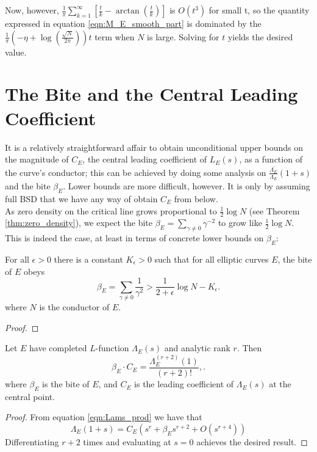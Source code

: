 \documentclass[10pt]{article}
\newcommand{\pr}{^{\prime}}
\newcommand{\Les}{L_E(s)}
\newcommand{\Lams}{\Lambda_E(s)}
\newcommand{\ldLam}[1]{\frac{\Lambda_E\pr}{\Lambda_E}\left(#1\right)}
\begin{document}
Now, however, $\frac{1}{\pi}\sum_{k=1}^{\infty} \left[\frac{t}{k} - \arctan\left(\frac{t}{k}\right)\right]$ is $O(t^3)$ for small t, so the quantity expressed in equation \ref{eqn:M_E_smooth_part} is dominated by the $\frac{1}{\pi}\left(-\eta+\log\left(\frac{\sqrt{N}}{2\pi}\right)\right) t$ term when $N$ is large. Solving for $t$ yields the desired value.

\newpage
\section{The Bite and the Central Leading Coefficient}

It is a relatively straightforward affair to obtain unconditional upper bounds on the magnitude of $C_E$, the central leading coefficient of $\Les$, as a function of the curve's conductor; this can be achieved by doing some analysis on $\ldLam{1+s}$ and the bite $\beta_E$. Lower bounds are more difficult, however. It is only by assuming full BSD that we have any way of obtain $C_E$ from below. \\

As zero density on the critical line grows proportional to $\frac{1}{2}\log N$ (see Theorem \ref{thm:zero_density}), we expect the bite $\beta_E = \sum_{\gamma\ne 0} \gamma^{-2}$ to grow like $\frac{1}{2}\log N$. This is indeed the case, at least in terms of concrete lower bounds on $\beta_E$:
\begin{lemma}[S.]
For all $\epsilon>0$ there is a constant $K_{\epsilon}>0$ such that for all elliptic curves $E$, the bite of $E$ obeys
\begin{equation}
\beta_E = \sum_{\gamma\ne 0} \frac{1}{\gamma^2} > \frac{1}{2+\epsilon} \log N - K_{\epsilon}.
\end{equation}
where $N$ is the conductor of $E$.
\end{lemma}
\begin{proof}

\end{proof}

\begin{proposition}\label{prop:bite_times_leading_coeff}
Let $E$ have completed $L$-function $\Lams$ and analytic rank $r$. Then
\begin{equation}
\beta_E\cdot C_E = \frac{\Lambda_E^{(r+2)}(1)}{(r+2)!},.
\end{equation}
where $\beta_E$ is the bite of $E$, and $C_E$ is the leading coefficient of $\Lams$ at the central point.
\end{proposition}
\begin{proof}
From equation \ref{eqn:Lams_prod} we have that 
\begin{equation}
\Lambda_E(1+s) = C_E\left(s^r + \beta_E s^{r+2} + O(s^{r+4})\right)
\end{equation}
Differentiating $r+2$ times and evaluating at $s=0$ achieves the desired result.
\end{proof}
\end{document}

